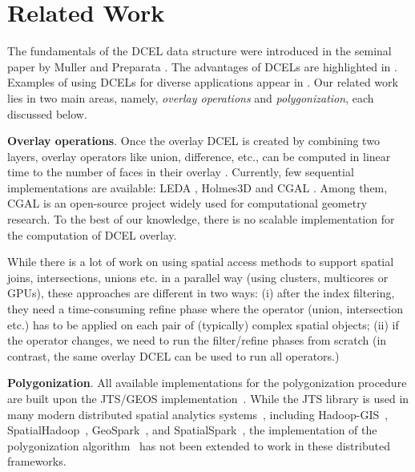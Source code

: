 \section{Related Work}\label{sec:related}
The fundamentals of the DCEL data structure were introduced in the seminal paper by Muller and Preparata  \cite{muller_finding_1978}. The advantages of DCELs are highlighted in \cite{preparata_computational_1985, berg_computational_2008}. Examples of using DCELs for diverse applications appear in \cite{barequet_dcel_1998, boltcheva_topological-based_2020, freiseisen_colored_1998}.
Our related work lies in two main areas, namely, \textit{overlay operations} and \textit{polygonization}, each discussed below.

\textbf{Overlay operations}.
Once the overlay DCEL is created by combining two layers, overlay operators like union, difference, etc., can be computed in linear time to the number of faces in their overlay \cite{freiseisen_colored_1998}. 
Currently, few sequential implementations are available: LEDA \cite{mehlhorn_leda_1995}, Holmes3D
\cite{holmes_dcel_2021} and CGAL \cite{fogel_cgal_2012}. Among them, CGAL is an open-source project widely used for computational geometry research. To the best of our knowledge, there is no scalable implementation for the computation of DCEL overlay.

While there is a lot of work on using spatial access methods to support spatial joins, intersections, unions etc. in a parallel way (using clusters, multicores or GPUs), \cite{challa_dd-rtree_2016, sabek_spatial_2017, li_scalable_2019, franklin_data_2018, magalhaes_fast_2015, puri_efficient_2013, puri_mapreduce_2013} these approaches are different in two ways: (i) after the index filtering, they need a time-consuming refine phase where the operator (union, intersection etc.) has to be applied on each pair of (typically) complex spatial objects; (ii) if the operator changes, we need to run the filter/refine phases from scratch (in contrast, the same overlay DCEL can be used to run all operators.)

\vspace{4pt}

\textbf{Polygonization}.
All available implementations for the polygonization procedure are built upon the JTS/GEOS implementation~\cite{web:jts:polygonizer, web:geos:polygonizer}. 
While the JTS library is used in many modern distributed spatial analytics systems~\cite{PVK21}, including Hadoop-GIS~\cite{AWV+13}, SpatialHadoop~\cite{EM15}, GeoSpark~\cite{YZS18}, and SpatialSpark~\cite{YZG15}, the implementation of the polygonization algorithm~\cite{web:jts:polygonizer} has not been extended to work in these distributed frameworks.


